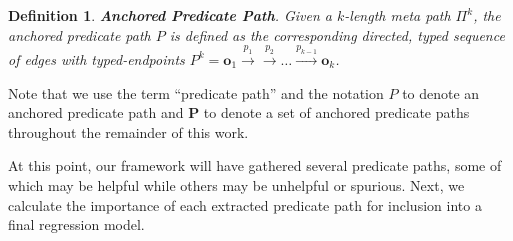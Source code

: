 \documentclass[reprint,twocolumn,showpacs,preprintnumbers,amsmath, aps,pre,amssymb]{revtex4-1}
\newtheorem{definition}{Definition}
\begin{document}
\begin{definition} \label{def:anchored_predicate_path}
\textbf{Anchored Predicate Path}. Given a $k$-length meta path $\Pi^{k}$, the anchored predicate path $P$ is defined as the corresponding directed, typed sequence of edges with typed-endpoints $P^{k} = \textbf{o}_1\xrightarrow{p_1}\xrightarrow{p_2}\ldots\xrightarrow{p_{k-1}}\textbf{o}_k$.
\end{definition}

Note that we use the term ``predicate path'' and the notation $P$ to denote an anchored predicate path and $\mathbf{P}$ to denote a set of anchored predicate paths throughout the remainder of this work. 

At this point, our framework will have gathered several predicate paths, some of which may be helpful while others may be unhelpful or spurious. Next, we calculate the importance of each extracted predicate path for inclusion into a final regression model.
\end{document}

